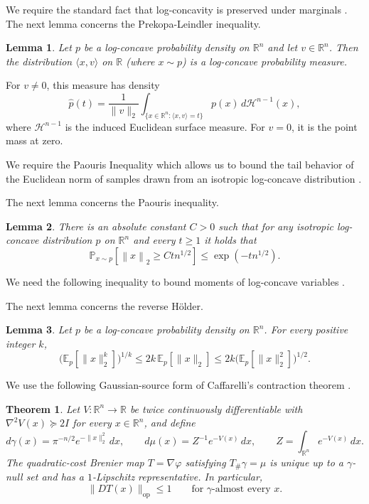 \documentclass[11pt]{article}
\numberwithin{equation}{section}
\newtheorem{theorem}{Theorem}
\newtheorem{lemma}{Lemma}[section]
\theoremstyle{definition}
\newcommand{\R}{\mathbb{R}}
\renewcommand{\l}{\langle}
\renewcommand{\r}{\rangle}
\newcommand{\E}[2]{\mathbb{E}_{#1}\left[#2\right]}
\renewcommand{\P}[2]{\mathbb{P}_{#1}\left[#2\right]}
\newcommand{\norm}[1]{\left\lVert#1\right\rVert}
\newcommand{\phat}{\widehat{p}}
\begin{document}
We require the standard fact that log-concavity is preserved under marginals
\cite{P73:journal}.
The next lemma concerns the Prekopa-Leindler inequality.

\begin{lemma}\label{lem:prekopa_leindler}
Let $p$ be a log-concave probability density on
$\R^n$ and let
$v \in \R^n$.
Then the distribution $\l x, v\r$ on
$\R$ (where
$x \sim p$) is a log-concave probability measure.
\end{lemma}
For $v\ne0$, this measure has density
\[
\phat(t)=\frac1{\|v\|_2}
\int_{\{x\in\R^n:\langle x,v\rangle=t\}}p(x)\,d\mathcal H^{n-1}(x),
\]
where $\mathcal H^{n-1}$ is the induced Euclidean surface measure.
For $v=0$, it is the point mass at zero.

We require the Paouris Inequality which allows us to bound the tail behavior of
the Euclidean norm of samples drawn from an isotropic log-concave distribution
\cite{P06:journal}.

The next lemma concerns the Paouris inequality.

\begin{lemma}\label{lem:prelim:paouris}
There is an absolute constant $C > 0$ such that for any isotropic log-concave
distribution
$p$ on
$\R^n$ and every
$t \geq 1$ it holds that
\[
\P{x \sim p}{\norm{x}_2 \geq Ct n^{1/2}}
\leq
\exp\left(-tn^{1/2}\right).
\]
\end{lemma}

We need the following inequality to bound moments of log-concave variables
\cite[Theorem~5.22]{LV07:journal}.

The next lemma concerns the reverse H{\"{o}}lder.

\begin{lemma}
\label{lem:reverse_holder}
Let $p$ be a log-concave probability density on $\R^n$.
For every positive integer $k$,
\[
\bigl(\E{p}{\|x\|_2^k}\bigr)^{1/k}
\leq 2k\,\E{p}{\|x\|_2}
\leq 2k\bigl(\E{p}{\|x\|_2^2}\bigr)^{1/2}.
\]
\end{lemma}

We use the following Gaussian-source form of Caffarelli's contraction theorem
\cite[Theorem~11]{C00:journal}.

\begin{theorem}
\label{thm:caffarelli-contraction}
Let $V:\R^n\to\R$ be twice continuously differentiable with
$\nabla^2V(x)\succeq2I$ for every $x\in\R^n$, and define
\[
d\gamma(x)=\pi^{-n/2}e^{-\|x\|_2^2}\,dx,
\qquad
d\mu(x)=Z^{-1}e^{-V(x)}\,dx,
\qquad
Z=\int_{\R^n}e^{-V(x)}\,dx.
\]
The quadratic-cost Brenier map $T=\nabla\varphi$ satisfying $T_\#\gamma=\mu$
is unique up to a $\gamma$-null set and has a $1$-Lipschitz representative.
In particular,
\[
\lVert DT(x)\rVert_{\mathrm{op}}\leq 1
\qquad\text{for $\gamma$-almost every $x$.}
\]
\end{theorem}
\end{document}
